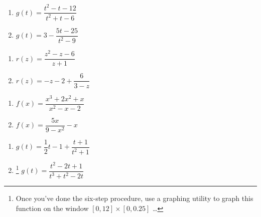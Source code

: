 \documentclass{ximera}
\begin{document}
\begin{multicols}{2}
\begin{enumerate}
\setcounter{enumi}{\value{HW}}

\item $g(t) = \dfrac{t^2-t-12}{t^2+t-6}$
\item $g(t) = 3- \dfrac{5t-25}{t^2-9}$

\setcounter{HW}{\value{enumi}}
\end{enumerate}
\end{multicols}

\begin{multicols}{2}
\begin{enumerate}
\setcounter{enumi}{\value{HW}}

\item $r(z) = \dfrac{z^2-z-6}{z+1}$

\item $r(z) =-z-2+\dfrac{6}{3-z}$

\setcounter{HW}{\value{enumi}}
\end{enumerate}
\end{multicols}

\begin{multicols}{2}
\begin{enumerate}
\setcounter{enumi}{\value{HW}}

\item $f(x) = \dfrac{x^3+2x^2+x}{x^2-x-2}$

\item $f(x) = \dfrac{5x}{9-x^2} - x$

\setcounter{HW}{\value{enumi}}
\end{enumerate}
\end{multicols}

\begin{multicols}{2}
\begin{enumerate}
\setcounter{enumi}{\value{HW}}

\item  $g(t) =\dfrac{1}{2}t-1 + \dfrac{t+1}{t^2+1}$

\item \hspace{-0.1in}\footnote{Once you've done the six-step procedure, use a graphing utility to graph this function on the window $[0, 12] \times [0, 0.25]$ \ldots} $g(t) = \dfrac{t^{2} - 2t + 1}{t^{3} + t^{2} - 2t}$ \label{sixsteplast}

\setcounter{HW}{\value{enumi}}
\end{enumerate}
\end{multicols}
\end{document}
